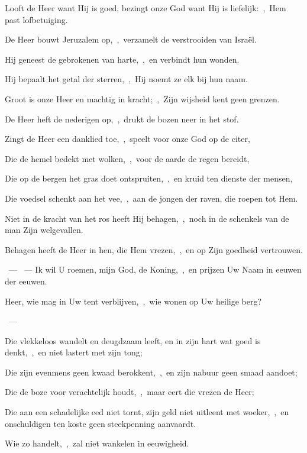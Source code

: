 \documentclass[12pt,twoside,a5paper]{article}
\begin{document}
\begin{halfparskip}
   Looft de Heer want Hij is goed, bezingt onze God want Hij is liefelijk:~\sep\ Hem past lofbetuiging.

  De Heer bouwt Jeruzalem op,~\sep\ verzamelt de verstrooiden van Israël.

  Hij geneest de gebrokenen van harte,~\sep\ en verbindt hun wonden.

  Hij bepaalt het getal der sterren,~\sep\ Hij noemt ze elk bij hun naam.

  Groot is onze Heer en machtig in kracht;~\sep\ Zijn wijsheid kent geen grenzen.

  De Heer heft de nederigen op,~\sep\ drukt de bozen neer in het stof.

  Zingt de Heer een danklied toe,~\sep\ speelt voor onze God op de citer,

  Die de hemel bedekt met wolken,~\sep\ voor de aarde de regen bereidt,

  Die op de bergen het gras doet ontspruiten,~\sep\ en kruid ten dienste der mensen,

  Die voedsel schenkt aan het vee,~\sep\ aan de jongen der raven, die roepen tot Hem.

  Niet in de kracht van het ros heeft Hij behagen,~\sep\ noch in de schenkels van de man Zijn welgevallen.

  Behagen heeft de Heer in hen, die Hem vrezen,~\sep\ en op Zijn goedheid vertrouwen.
\end{halfparskip}

\begin{halfparskip}
  ~--- ~---  Ik wil U roemen, mijn God, de Koning,~\sep\ en prijzen Uw Naam in eeuwen der eeuwen.
\end{halfparskip}

\begin{halfparskip}
   
\end{halfparskip}

\begin{halfparskip}
   Heer, wie mag in Uw tent verblijven,~\sep\ wie wonen op Uw heilige berg?

  ~--- 

  Die vlekkeloos wandelt en deugdzaam leeft, en in zijn hart wat goed is denkt,~\sep\ en niet lastert met zijn tong;

  Die zijn evenmens geen kwaad berokkent,~\sep\ en zijn nabuur geen smaad aandoet;

  Die de boze voor verachtelijk houdt,~\sep\ maar eert die vrezen de Heer;

  Die aan een schadelijke eed niet tornt, zijn geld niet uitleent met woeker,~\sep\ en onschuldigen ten koste geen steekpenning aanvaardt.

  Wie zo handelt,~\sep\ zal niet wankelen in eeuwigheid.
\end{halfparskip}
\end{document}
